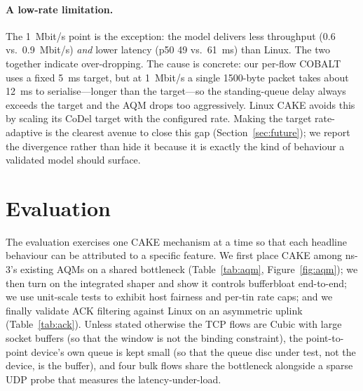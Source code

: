 \documentclass[sigconf,nonacm]{acmart}
\begin{document}
\paragraph{A low-rate limitation.} The 1~Mbit/s point is the exception: the
model delivers less throughput (0.6 vs.\ 0.9~Mbit/s) \emph{and} lower latency
(p50 49 vs.\ 61~ms) than Linux. The two together indicate over-dropping. The
cause is concrete: our per-flow COBALT uses a fixed 5~ms target, but at
1~Mbit/s a single 1500-byte packet takes about 12~ms to serialise---longer than
the target---so the standing-queue delay always exceeds the target and the AQM
drops too aggressively. Linux CAKE avoids this by scaling its CoDel target with
the configured rate. Making the target rate-adaptive is the clearest avenue to
close this gap (Section~\ref{sec:future}); we report the divergence rather than
hide it because it is exactly the kind of behaviour a validated model should
surface.

\section{Evaluation}
\label{sec:eval}

The evaluation exercises one CAKE mechanism at a time so that each headline
behaviour can be attributed to a specific feature. We first place CAKE among
ns-3's existing AQMs on a shared bottleneck (Table~\ref{tab:aqm},
Figure~\ref{fig:aqm}); we then turn on the integrated shaper and show it
controls bufferbloat end-to-end; we use unit-scale tests to exhibit host
fairness and per-tin rate caps; and we finally validate ACK filtering against
Linux on an asymmetric uplink (Table~\ref{tab:ack}). Unless stated otherwise the
TCP flows are Cubic with large socket buffers (so that the window is not the
binding constraint), the point-to-point device's own queue is kept small (so
that the queue disc under test, not the device, is the buffer), and four bulk
flows share the bottleneck alongside a sparse UDP probe that measures the
latency-under-load.
\end{document}
